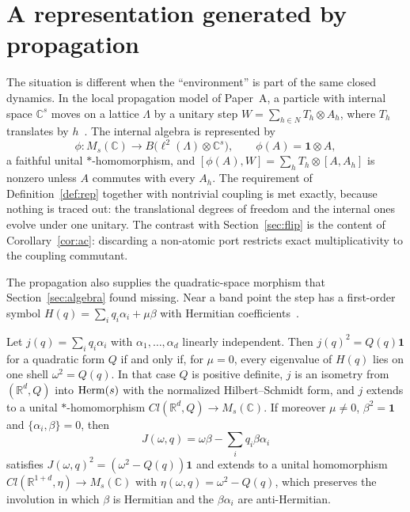 \section{A representation generated by propagation}
\label{sec:propagation}

The situation is different when the ``environment'' is part of the same closed dynamics. In the local propagation model of Paper~A, a particle with internal space $\mathbb C^s$ moves on a lattice $\Lambda$ by a unitary step $W=\sum_{h\in N}T_h\otimes A_h$, where $T_h$ translates by $h$~\cite{Liu2026QRAIF_A}. The internal algebra is represented by
\begin{equation}
\phi:M_s(\mathbb C)\to B\bigl(\ell^2(\Lambda)\otimes\mathbb C^s\bigr),\qquad \phi(A)=\mathbf 1\otimes A,
\end{equation}
a faithful unital $*$-homomorphism, and $[\phi(A),W]=\sum_hT_h\otimes[A,A_h]$ is nonzero unless $A$ commutes with every $A_h$. The requirement of Definition~\ref{def:rep} together with nontrivial coupling is met exactly, because nothing is traced out: the translational degrees of freedom and the internal ones evolve under one unitary. The contrast with Section~\ref{sec:flip} is the content of Corollary~\ref{cor:ac}: discarding a non-atomic port restricts exact multiplicativity to the coupling commutant.

The propagation also supplies the quadratic-space morphism that Section~\ref{sec:algebra} found missing. Near a band point the step has a first-order symbol $H(q)=\sum_iq_i\alpha_i+\mu\beta$ with Hermitian coefficients~\cite{Liu2026QRAIF_A}.

\begin{proposition}
\label{prop:symbol}
Let $j(q)=\sum_iq_i\alpha_i$ with $\alpha_1,\dots,\alpha_d$ linearly independent. Then $j(q)^2=Q(q)\mathbf 1$ for a quadratic form $Q$ if and only if, for $\mu=0$, every eigenvalue of $H(q)$ lies on one shell $\omega^2=Q(q)$. In that case $Q$ is positive definite, $j$ is an isometry from $(\mathbb R^d,Q)$ into $\operatorname{Herm}(s)$ with the normalized Hilbert--Schmidt form, and $j$ extends to a unital $*$-homomorphism $Cl(\mathbb R^d,Q)\to M_s(\mathbb C)$. If moreover $\mu\ne0$, $\beta^2=\mathbf 1$ and $\{\alpha_i,\beta\}=0$, then
\begin{equation}
J(\omega,q)=\omega\beta-\sum_iq_i\beta\alpha_i
\end{equation}
satisfies $J(\omega,q)^2=(\omega^2-Q(q))\mathbf 1$ and extends to a unital homomorphism $Cl(\mathbb R^{1+d},\eta)\to M_s(\mathbb C)$ with $\eta(\omega,q)=\omega^2-Q(q)$, which preserves the involution in which $\beta$ is Hermitian and the $\beta\alpha_i$ are anti-Hermitian.
\end{proposition}

